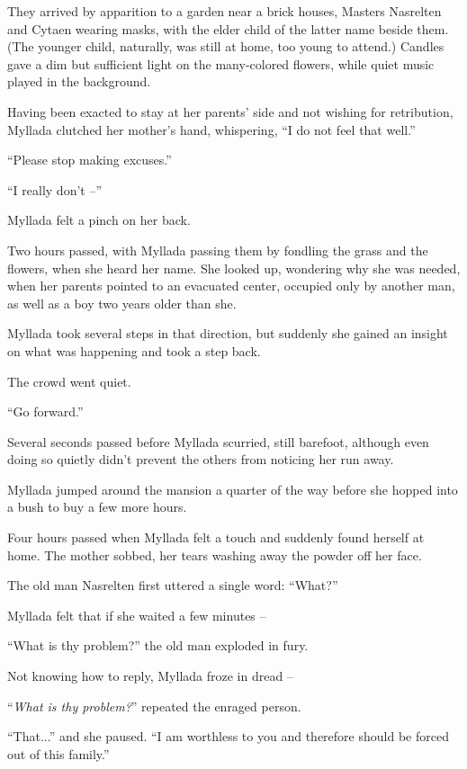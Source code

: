They arrived by apparition to a garden near a brick houses, Masters Nasrelten and Cytaen wearing masks, with the elder child of the latter name beside them. (The younger child, naturally, was still at home, too young to attend.) Candles gave a dim but sufficient light on the many-colored flowers, while quiet music played in the background.

Having been exacted to stay at her parents' side and not wishing for retribution, Myllada clutched her mother's hand, whispering, ``I do not feel that well.''

``Please stop making excuses.''

``I really don't --''

Myllada felt a pinch on her back.

\centeredstars

Two hours passed, with Myllada passing them by fondling the grass and the flowers, when she heard her name. She looked up, wondering why she was needed, when her parents pointed to an evacuated center, occupied only by another man, as well as a boy two years older than she.

Myllada took several steps in that direction, but suddenly she gained an insight on what was happening and took a step back.

The crowd went quiet.

``Go forward.''

Several seconds passed before Myllada scurried, still barefoot, although even doing so quietly didn't prevent the others from noticing her run away.

Myllada jumped around the mansion a quarter of the way before she hopped into a bush to buy a few more hours.

\centeredstars

Four hours passed when Myllada felt a touch and suddenly found herself at home. The mother sobbed, her tears washing away the powder off her face.

The old man Nasrelten first uttered a single word: ``What?''

Myllada felt that if she waited a few minutes --

``What is thy problem?'' the old man exploded in fury.

Not knowing how to reply, Myllada froze in dread --

``\emph{What is thy problem?}'' repeated the enraged person.

``That...'' and she paused. ``I am worthless to you and therefore should be forced out of this family.''

